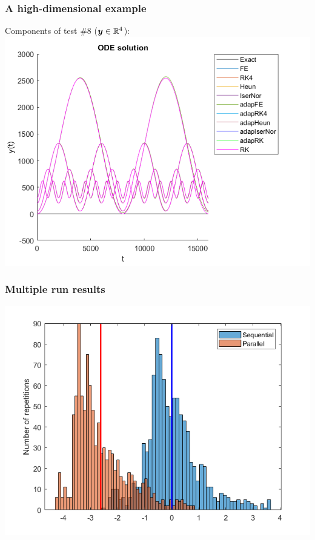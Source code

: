 \documentclass{beamer}
\begin{document}
\begin{frame}
\begin{figure}
\begin{subfigure}{.5\textwidth}
		\end{subfigure}
	\end{figure}
\end{frame}


\begin{frame} %
	\frametitle{A high-dimensional example}
	\begin{center}
		Components of test \#8 ($\boldsymbol y \in \mathbb R^4$): \\[15pt]
		\includegraphics[width=0.75 \linewidth]{etc/results_test_8.png}
	\end{center}
\end{frame}


\begin{frame} %
	\frametitle{Multiple run results}
	\begin{center}
		\includegraphics[width=\linewidth]{etc/test8_3.jpeg}
	\end{center}
\end{frame}
\end{document}
